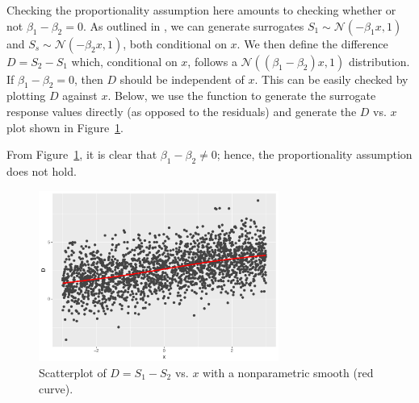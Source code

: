 Checking the proportionality assumption here amounts to checking whether or not $\beta_1 - \beta_2 = 0$. As outlined in \citet{residuals-liu-2017}, we can generate surrogates $S_1 \sim \mathcal{N}\left(-\beta_1 x, 1\right)$ and $S_s \sim \mathcal{N}\left(-\beta_2 x, 1\right)$, both conditional on $x$. We then define the difference $D = S_2 - S_1$ which, conditional on $x$, follows a $\mathcal{N}\left(\left(\beta_1 - \beta_2\right) x, 1\right)$ distribution. If $\beta_1 - \beta_2 = 0$, then $D$ should be independent of $x$. This can be easily checked by plotting $D$ against $x$. Below, we use the  function to generate the surrogate response values directly (as opposed to the residuals) and generate the $D$ vs. $x$ plot shown in Figure~\ref{fig:proportionality}.
From Figure~\ref{fig:proportionality}, it is clear that $\beta_1 - \beta_2 $; hence, the proportionality assumption does not hold.

\begin{figure}[!htbp]
  \centering
  \includegraphics[width=0.7\textwidth]{proportionality}
  \caption{Scatterplot of $D = S_1 - S_2$ vs. $x$ with a nonparametric smooth (red curve).}
  \label{fig:proportionality}
\end{figure}


